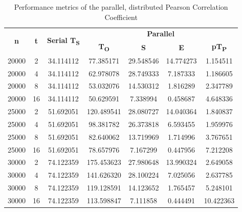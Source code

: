 \documentclass[journal]{./IEEE/IEEEtran}
\begin{document}
\begin{table}[]
\begin{center}
    \caption{Performance metrics of the parallel, distributed Pearson Correlation Coefficient}
    \begin{tabular}{|c|c|c|cccc|}
\hline
\multirow{2}{*}{\textbf{n}} & \multirow{2}{*}{\textbf{t}} & \multirow{2}{*}{\textbf{Serial T\textsubscript{S}}} & \multicolumn{4}{c|}{\textbf{Parallel}} \\ \cline{4-7} 
 &  &  & \multicolumn{1}{c|}{\textbf{T\textsubscript{O}}} & \multicolumn{1}{c|}{\textbf{S}} & \multicolumn{1}{c|}{\textbf{E}} & \textbf{pT\textsubscript{P}} \\ \hline
20000 & 2 & 34.114112 & \multicolumn{1}{c|}{77.385171} & \multicolumn{1}{c|}{29.548546} & \multicolumn{1}{c|}{14.774273} & 1.154511 \\ \hline
20000 & 4 & 34.114112 & \multicolumn{1}{c|}{62.978078} & \multicolumn{1}{c|}{28.749333} & \multicolumn{1}{c|}{7.187333} & 1.186605 \\ \hline
20000 & 8 & 34.114112 & \multicolumn{1}{c|}{53.032076} & \multicolumn{1}{c|}{14.530312} & \multicolumn{1}{c|}{1.816289} & 2.347789 \\ \hline
20000 & 16 & 34.114112 & \multicolumn{1}{c|}{50.629591} & \multicolumn{1}{c|}{7.338994} & \multicolumn{1}{c|}{0.458687} & 4.648336 \\ \hline
25000 & 2 & 51.692051 & \multicolumn{1}{c|}{120.489541} & \multicolumn{1}{c|}{28.080727} & \multicolumn{1}{c|}{14.040364} & 1.840837 \\ \hline
25000 & 4 & 51.692051 & \multicolumn{1}{c|}{98.381782} & \multicolumn{1}{c|}{26.373818} & \multicolumn{1}{c|}{6.593455} & 1.959976 \\ \hline
25000 & 8 & 51.692051 & \multicolumn{1}{c|}{82.640062} & \multicolumn{1}{c|}{13.719969} & \multicolumn{1}{c|}{1.714996} & 3.767651 \\ \hline
25000 & 16 & 51.692051 & \multicolumn{1}{c|}{78.657976} & \multicolumn{1}{c|}{7.167299} & \multicolumn{1}{c|}{0.447956} & 7.212208 \\ \hline
30000 & 2 & 74.122359 & \multicolumn{1}{c|}{175.453623} & \multicolumn{1}{c|}{27.980648} & \multicolumn{1}{c|}{13.990324} & 2.649058 \\ \hline
30000 & 4 & 74.122359 & \multicolumn{1}{c|}{141.626320} & \multicolumn{1}{c|}{28.100224} & \multicolumn{1}{c|}{7.025056} & 2.637785 \\ \hline
30000 & 8 & 74.122359 & \multicolumn{1}{c|}{119.128591} & \multicolumn{1}{c|}{14.123652} & \multicolumn{1}{c|}{1.765457} & 5.248101 \\ \hline
30000 & 16 & 74.122359 & \multicolumn{1}{c|}{113.598847} & \multicolumn{1}{c|}{7.111858} & \multicolumn{1}{c|}{0.444491} & 10.422363 \\ \hline
    \end{tabular}
    \label{table3}
\end{center}
\end{table}
\end{document}
